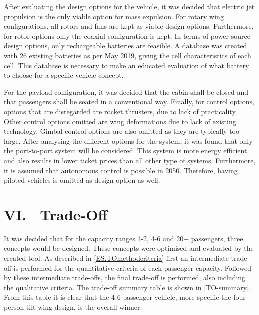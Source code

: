 After evaluating the design options for the vehicle, it was decided that electric jet propulsion is the only viable option for mass expulsion. For rotary wing configurations, all rotors and fans are kept as viable design options. Furthermore, for rotor options only the coaxial configuration is kept. In terms of power source design options, only rechargeable batteries are feasible. A database was created with 26 existing batteries as per May 2019, giving the cell characteristics of each cell. This database is necessary to make an educated evaluation of what battery to choose for a specific vehicle concept.

For the payload configuration, it was decided that the cabin shall be closed and that passengers shall be seated in a conventional way. Finally, for control options, options that are disregarded are rocket thrusters, due to lack of practicality. Other control options omitted are wing deformations due to lack of existing technology. Gimbal control options are also omitted as they are typically too large. 
After analysing the different options for the system, it was found that only the port-to-port system will be considered. This system is more energy efficient and also results in lower ticket prices than all other type of systems. Furthermore, it is assumed that autonomous control is possible in 2050. Therefore, having piloted vehicles is omitted as design option as well.

\section*{VI. \ Trade-Off}
\label{ES.TO}

It was decided that for the capacity ranges 1-2, 4-6 and 20+ passengers, three concepts would be designed. These concepts were optimised and evaluated by the created tool. As described in \autoref{ES.TOmethodcriteria} first an intermediate trade-off is performed for the quantitative criteria of each passenger capacity. Followed by these intermediate trade-offs, the final trade-off is performed, also including the qualitative criteria. The trade-off summary table is shown in \autoref{TO-summary}. From this table it is clear that the 4-6 passenger vehicle, more specific the four person tilt-wing design, is the overall winner.


